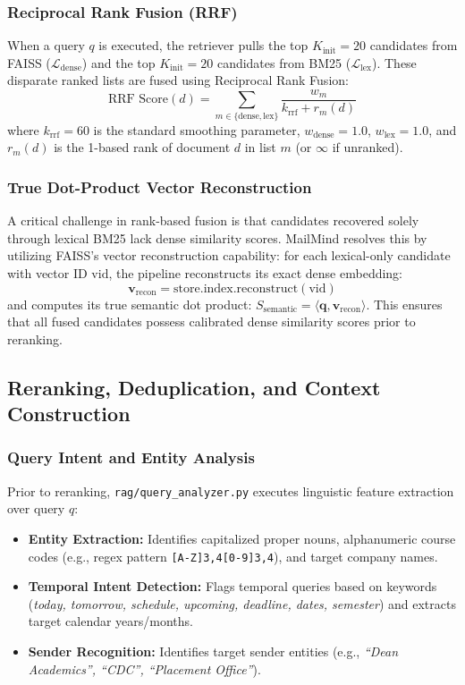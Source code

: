 \documentclass[11pt,a4paper]{article}
\begin{document}
\subsubsection{Reciprocal Rank Fusion (RRF)}
When a query $q$ is executed, the retriever pulls the top $K_{\text{init}} = 20$ candidates from FAISS ($\mathcal{L}_{\text{dense}}$) and the top $K_{\text{init}} = 20$ candidates from BM25 ($\mathcal{L}_{\text{lex}}$). These disparate ranked lists are fused using Reciprocal Rank Fusion:
\begin{equation}
    \text{RRF Score}(d) = \sum_{m \in \{\text{dense}, \text{lex}\}} \frac{w_m}{k_{\text{rrf}} + r_m(d)}
\end{equation}
where $k_{\text{rrf}} = 60$ is the standard smoothing parameter, $w_{\text{dense}} = 1.0$, $w_{\text{lex}} = 1.0$, and $r_m(d)$ is the 1-based rank of document $d$ in list $m$ (or $\infty$ if unranked).

\subsubsection{True Dot-Product Vector Reconstruction}
A critical challenge in rank-based fusion is that candidates recovered solely through lexical BM25 lack dense similarity scores. MailMind resolves this by utilizing FAISS's vector reconstruction capability: for each lexical-only candidate with vector ID $\text{vid}$, the pipeline reconstructs its exact dense embedding:
\begin{equation}
    \mathbf{v}_{\text{recon}} = \text{store.index.reconstruct}(\text{vid})
\end{equation}
and computes its true semantic dot product: $S_{\text{semantic}} = \langle \mathbf{q}, \mathbf{v}_{\text{recon}} \rangle$. This ensures that all fused candidates possess calibrated dense similarity scores prior to reranking.

\subsection{Reranking, Deduplication, and Context Construction}
\subsubsection{Query Intent and Entity Analysis}
Prior to reranking, \texttt{rag/query\_analyzer.py} executes linguistic feature extraction over query $q$:
\begin{itemize}
    \item \textbf{Entity Extraction:} Identifies capitalized proper nouns, alphanumeric course codes (e.g., regex pattern \texttt{[A-Z]{3,4}[0-9]{3,4}}), and target company names.
    \item \textbf{Temporal Intent Detection:} Flags temporal queries based on keywords (\textit{today, tomorrow, schedule, upcoming, deadline, dates, semester}) and extracts target calendar years/months.
    \item \textbf{Sender Recognition:} Identifies target sender entities (e.g., \textit{``Dean Academics'', ``CDC'', ``Placement Office''}).
\end{itemize}
\end{document}
